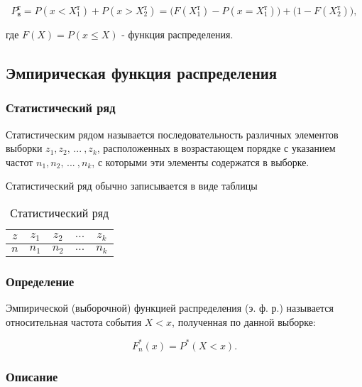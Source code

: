 \begin{equation} \label{eq:probTheorDisc}
    P_\text{в}^\text{т} = P(x < X_1^\text{т}) + P(x > X_2^\text{т}) = \Big(F(X_1^\text{т}) - P(x = X_1^\text{т})\Big) + \Big(1 - F(X_2^\text{т})\Big),
\end{equation}

где $F(X) = P(x \le X)$ - функция распределения.

\subsection{Эмпирическая функция распределения}

\subsubsection{Статистический ряд}

Статистическим рядом называется последовательность различных элементов выборки $z_1, z_2, \, ... \: , z_k$, расположенных в возрастающем порядке с указанием частот $n_1, n_2, \, ... \: , n_k$, с которыми эти элементы содержатся в выборке.

Статистический ряд обычно записывается в виде таблицы

\begin{table}[h!]
\begin{center}
\begin{tabular}{|c|c|c|c|c|}
\hline
$z$ & $z_1$ & $z_2$ & $...$ & $z_k$ \\
\hline
$n$ & $n_1$ & $n_2$ & $...$ & $n_k$ \\
\hline
\end{tabular}
\end{center}
\caption{Статистический ряд}
\end{table} 

\subsubsection{Определение}

Эмпирической (выборочной) функцией распределения (э. ф. р.) называется относительная частота события $X < x$, полученная по данной выборке:

\begin{equation}
    F_n^*(x) = P^*(X < x).
\end{equation}

\subsubsection{Описание}

